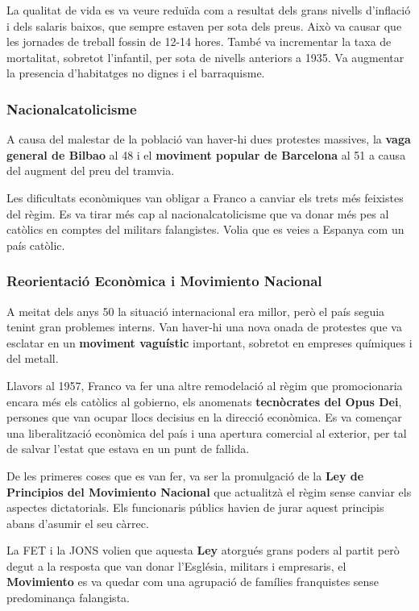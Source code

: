 \documentclass[arial,a4paper,print]{article}
\begin{document}
La qualitat de vida es va veure reduïda com a resultat dels grans nivells d'inflació i dels salaris baixos, que sempre estaven per sota dels preus. Això va causar que les jornades de treball fossin de 12-14 hores. També va incrementar la taxa de mortalitat, sobretot l'infantil, per sota de nivells anteriors a 1935. Va augmentar la presencia d'habitatges no dignes i el barraquisme. 

\subsubsection{Nacionalcatolicisme}
A causa del malestar de la població van haver-hi dues protestes massives, la \textbf{vaga general de Bilbao} al 48 i el \textbf{moviment popular de Barcelona} al 51 a causa del augment del preu del tramvia. 

Les dificultats econòmiques van obligar a Franco a canviar els trets més feixistes del règim. Es va tirar més cap al nacionalcatolicisme que va donar més pes al catòlics en comptes del militars falangistes. Volia que es veies a Espanya com un país catòlic. 

\subsubsection{Reorientació Econòmica i Movimiento Nacional}
A meitat dels anys 50 la situació internacional era millor, però el país seguia tenint gran problemes interns. Van haver-hi una nova onada de protestes que va esclatar en un \textbf{moviment vaguístic} important, sobretot en empreses químiques i del metall. 

Llavors al 1957, Franco va fer una altre remodelació al règim que promocionaria encara més els catòlics al gobierno, els anomenats \textbf{tecnòcrates del Opus Dei}, persones que van ocupar llocs decisius en la direcció econòmica. Es va començar una liberalització econòmica del país i una apertura comercial al exterior, per tal de salvar l'estat que estava en un punt de fallida. 

De les primeres coses que es van fer, va ser la promulgació de la \textbf{Ley de Principios del Movimiento Nacional} que actualitzà el règim sense canviar els aspectes dictatorials. Els funcionaris públics havien de jurar aquest principis abans d'asumir el seu càrrec. 

La FET i la JONS volien que aquesta \textbf{Ley} atorgués grans poders al partit però degut a la resposta que van donar l'Església, militars i empresaris, el \textbf{Movimiento} es va quedar com una agrupació de famílies franquistes sense predominança falangista. 
\end{document}
